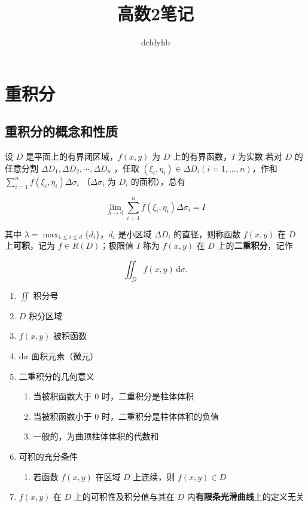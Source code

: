 \documentclass[lang = zh , final , oneside , openany , titlepage , zihao = -4 , linespread = 1.3 , baselineskip = false , cjk-font = windows , text-font = newtx , math-font = newtx]{sjtureport}
\title{高数2笔记}
\author{dcldyhb}
\begin{document}
\maketitle

\setcounter{page}{1}  %
\pagestyle{plain}     %
\tableofcontents


\newpage
\setcounter{page}{1}  %
\pagestyle{plain}     %
\chapter{重积分}
\section{重积分的概念和性质}
\begin{definition}
    设 $D$ 是平面上的有界闭区域，$f(x,y)$ 为 $D$ 上的有界函数，$I$ 为实数.若对 $D$ 的任意分割 $\Delta D_1 , \Delta D_2 , \cdots , \Delta D_n$ ，任取 $(\xi_i , \eta_i)\in\Delta D_i(i=1,\ldots,n)$，作和 $\displaystyle\sum_{i=1}^nf(\xi_i,\eta_i)\Delta \sigma_i$ （$\Delta \sigma_i$ 为 $D_i$ 的面积），总有

    $$
    \lim_{\lambda\to 0}\sum_{i=1}^nf(\xi_i,\eta_i)\Delta \sigma_i = I
    $$

    其中 $\displaystyle\lambda = \max_{1\leq i\leq d} \{d_i\}$，$d_i$ 是小区域 $\Delta D_i$ 的直径，则称函数 $f(x,y)$ 在 $D$ 上\textbf{可积}，记为 $f\in R(D)$；极限值 $I$ 称为 $f(x,y)$ 在 $D$ 上的\textbf{二重积分}，记作

    $$
    \iint_D f(x,y)\,\mathrm{d}\sigma.
    $$
\end{definition}

\begin{enumerate}
    \item $\displaystyle \iint$ 积分号
    \item $D$ 积分区域
    \item $f(x,y)$ 被积函数
    \item $\mathrm{d}\sigma$ 面积元素（微元）
    \item 二重积分的几何意义
        \begin{enumerate}
            \item 当被积函数大于 $0$ 时，二重积分是柱体体积
            \item 当被积函数小于 $0$ 时，二重积分是柱体体积的负值
            \item 一般的，为曲顶柱体体积的代数和
        \end{enumerate}
    \item 可积的充分条件
        \begin{enumerate}
            \item 若函数 $f(x,y)$ 在区域 $D$ 上连续，则 $f(x,y)\in D$
        \end{enumerate}
    \item $f(x,y)$ 在 $D$ 上的可积性及积分值与其在 $D$ 内\textbf{有限条光滑曲线}上的定义无关
\end{enumerate}
\end{document}
